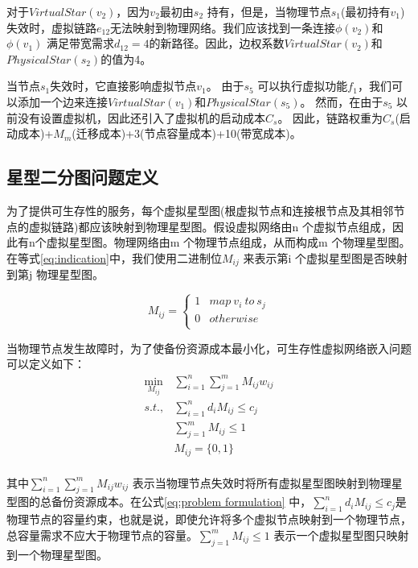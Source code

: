 对于$VirtualStar(v_2)$，因为$v_2$最初由$s_2$ 持有，但是，当物理节点$s_1$(最初持有$v_1$)失效时，虚拟链路$e_{12}$无法映射到物理网络。我们应该找到一条连接$\phi(v_2)$和$\phi(v_1)$ 满足带宽需求$d_{12}=4$的新路径。因此，边权系数$VirtualStar(v_2)$和$PhysicalStar(s_2)$的值为4。

当节点$s_1$失效时，它直接影响虚拟节点$v_1$。 由于$s_5$ 可以执行虚拟功能$f_1$，我们可以添加一个边来连接$VirtualStar(v_1)$和$PhysicalStar(s_5)$。 然而，在由于$s_5$ 以前没有设置虚拟机，因此还引入了虚拟机的启动成本$C_s$。 因此，链路权重为$C_s$(启动成本)+$M_m$(迁移成本)+3(节点容量成本)+10(带宽成本)。

\subsection{星型二分图问题定义}
为了提供可生存性的服务，每个虚拟星型图(根虚拟节点和连接根节点及其相邻节点的虚拟链路)都应该映射到物理星型图。假设虚拟网络由n 个虚拟节点组成，因此有n个虚拟星型图。物理网络由m 个物理节点组成，从而构成m 个物理星型图。在等式\ref{eq:indication}中，我们使用二进制位$M_{ij}$ 来表示第i 个虚拟星型图是否映射到第j 物理星型图。

\begin{equation}
{M_{ij}} = \left\{ {\begin{array}{*{20}{c}}
   1 & {map \ v_i \  to  \ s_j}  \\
   0 & {otherwise}  \\
\end{array}} \right.
\label{eq:indication}
\end{equation}

当物理节点发生故障时，为了使备份资源成本最小化，可生存性虚拟网络嵌入问题可以定义如下：
\begin{equation}
\begin{array}{*{20}{c}}
   {\mathop {\min }\limits_{{M_{ij}}} } & {\sum\limits_{i = 1}^n {\sum\limits_{j = 1}^m {{M_{ij}}{w_{ij}}} } }  \\
   {s.t.,} & {\sum\limits_{i = 1}^n {{d_i}{M_{ij}}}  \le {c_j}}  \\
   {} & {\sum\limits_{j = 1}^m {{M_{ij}}}  \le 1}  \\
   {} & {{M_{ij}} = \{ 0,1\} }  \\
\end{array}
\label{eq:problem formulation}
\end{equation}

其中${\sum\limits_{i = 1}^n {\sum\limits_{j = 1}^m {{M_{ij}}{w_{ij}}} } }$ 表示当物理节点失效时将所有虚拟星型图映射到物理星型图的总备份资源成本。在公式\ref{eq:problem formulation} 中，${\sum\limits_{i = 1}^n {{d_i}{M_{ij}}}  \le {c_j}}$是物理节点的容量约束，也就是说，即使允许将多个虚拟节点映射到一个物理节点，总容量需求不应大于物理节点的容量。${\sum\limits_{j = 1}^m {{M_{ij}}}  \le 1}$ 表示一个虚拟星型图只映射到一个物理星型图。


